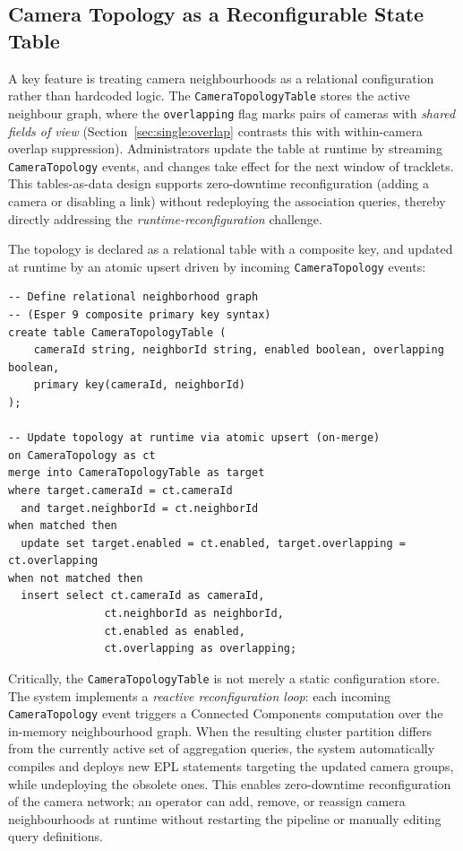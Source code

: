 \documentclass[review]{elsarticle}
\begin{document}
\subsection{Camera Topology as a Reconfigurable State Table}
\label{sec:multi:topology}
A key feature is treating camera neighbourhoods as a relational configuration rather than hardcoded logic. The \texttt{CameraTopologyTable} stores the active neighbour graph, where the \texttt{overlapping} flag marks pairs of cameras with \emph{shared fields of view} (Section~\ref{sec:single:overlap} contrasts this with within-camera overlap suppression). Administrators update the table at runtime by streaming \texttt{CameraTopology} events, and changes take effect for the next window of tracklets. This tables-as-data design supports zero-downtime reconfiguration (adding a camera or disabling a link) without redeploying the association queries, thereby directly addressing the \emph{runtime-reconfiguration} challenge.

The topology is declared as a relational table with a composite key, and updated at runtime by an atomic upsert driven by incoming \texttt{CameraTopology} events:
\begin{verbatim}
-- Define relational neighborhood graph
-- (Esper 9 composite primary key syntax)
create table CameraTopologyTable (
    cameraId string, neighborId string, enabled boolean, overlapping boolean,
    primary key(cameraId, neighborId)
);

-- Update topology at runtime via atomic upsert (on-merge)
on CameraTopology as ct
merge into CameraTopologyTable as target
where target.cameraId = ct.cameraId
  and target.neighborId = ct.neighborId
when matched then
  update set target.enabled = ct.enabled, target.overlapping = ct.overlapping
when not matched then
  insert select ct.cameraId as cameraId,
               ct.neighborId as neighborId,
               ct.enabled as enabled,
               ct.overlapping as overlapping;
\end{verbatim}

Critically, the \texttt{CameraTopologyTable} is not merely a static configuration store. The system implements a \emph{reactive reconfiguration loop}: each incoming \texttt{CameraTopology} event triggers a Connected Components computation over the in-memory neighbourhood graph. When the resulting cluster partition differs from the currently active set of aggregation queries, the system automatically compiles and deploys new EPL statements targeting the updated camera groups, while undeploying the obsolete ones. This enables zero-downtime reconfiguration of the camera network; an operator can add, remove, or reassign camera neighbourhoods at runtime without restarting the pipeline or manually editing query definitions.
\end{document}
